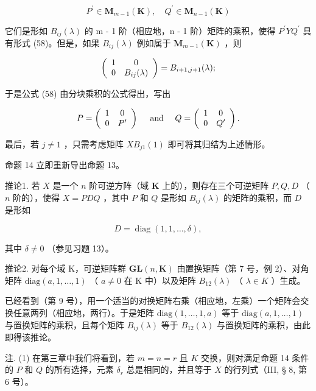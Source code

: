 \[
P ^ {\prime} \in \mathbf {M} _ {m - 1} (\mathbf {K}), \quad Q ^ {\prime} \in \mathbf {M} _ {n - 1} (\mathbf {K})
\]

它们是形如 \(B_{ij}(\lambda)\) 的 m - 1 阶（相应地，n - 1 阶）矩阵的乘积，使得 \(P^{\prime}YQ^{\prime}\) 具有形式 (58)。但是，如果 \(B_{ij}(\lambda)\) 例如属于 \(\mathbf{M}_{m-1}(\mathbf{K})\) ，则

\[
\left( \begin{array}{c c} 1 & 0 \\ 0 & B _ {i j} (\lambda) \end{array} \right) = B _ {i + 1, j + 1} (\lambda);
\]

于是公式 (58) 由分块乘积的公式得出，写出

\[
P = \left( \begin{array}{c c} 1 & 0 \\ 0 & P ^ {\prime} \end{array} \right) \quad \text { and } \quad Q = \left( \begin{array}{c c} 1 & 0 \\ 0 & Q ^ {\prime} \end{array} \right).
\]

最后，若 \(j \neq 1\) ，只需考虑矩阵 \(XB_{j1}(1)\) 即可将其归结为上述情形。

命题 14 立即重新导出命题 13。

推论1. 若 \(X\) 是一个 \(n\) 阶可逆方阵（域 \(\mathbf{K}\) 上的），则存在三个可逆矩阵 \(P, Q, D\) （ \(n\) 阶的），使得 \(X = PDQ\) ，其中 \(P\) 和 \(Q\) 是形如 \(B_{ij}(\lambda)\) 的矩阵的乘积，而 \(D\) 是形如

\[
D = \operatorname{diag} (1, 1, \dots , \delta),
\]

其中 \(\delta \neq 0\) （参见习题 13）。

推论2. 对每个域 K，可逆矩阵群 \(\mathbf{GL}(n,\mathbf{K})\) 由置换矩阵（第 7 号，例 2）、对角矩阵 \(\text{diag}(a,1,\ldots,1)\) （ \(a\neq0\) 在 K 中）以及矩阵 \(B_{12}(\lambda)\) （ \(\lambda\in K\) ）生成。

已经看到（第 9 号），用一个适当的对换矩阵右乘（相应地，左乘）一个矩阵会交换任意两列（相应地，两行）。于是矩阵 \(\text{diag}(1, \ldots, 1, a)\) 等于 \(\text{diag}(a, 1, \ldots, 1)\) 与置换矩阵的乘积，且每个矩阵 \(B_{ij}(\lambda)\) 等于 \(B_{12}(\lambda)\) 与置换矩阵的乘积，由此即得该推论。

注. (1) 在第三章中我们将看到，若 \(m = n = r\) 且 \(K\) 交换，则对满足命题 14 条件的 \(P\) 和 \(Q\) 的所有选择，元素 \(\delta_r\) 总是相同的，并且等于 \(X\) 的行列式（III, § 8, 第 6 号）。

